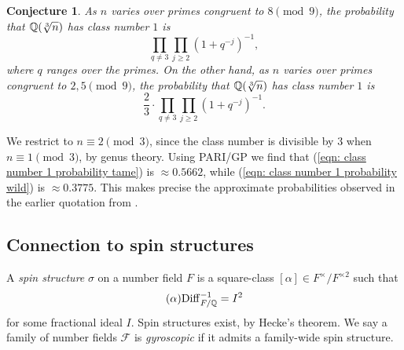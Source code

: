 \documentclass[11pt,a4paper]{amsart}
\def\Q{{\rm \mathbb{Q}}}
\def\Diff{{\rm Diff}}
\numberwithin{equation}{section}
\newtheorem{conjecture}[theorem]{Conjecture}
\begin{document}
\begin{conjecture} \label{conj: probability that h/h3 = 1}
As $n$ varies over primes congruent to $8 \pmod{9}$, the probability that 
$\Q(\sqrt[3]{n})$ has class number $1$ is
\begin{equation} \label{eqn: class number 1 probability tame}
    \prod_{q \neq 3} \prod_{j \ge 2} (1+q^{-j})^{-1},
\end{equation}
where $q$ ranges over the primes. On the other hand, as $n$ varies over primes congruent to $2,5 \pmod{9}$,  the probability that $\Q(\sqrt[3]{n})$ has class number $1$ is
\begin{equation} \label{eqn: class number 1 probability wild}
    \frac23\cdot 
\prod_{q\neq3} \prod_{j \ge 2} (1+q^{-j})^{-1}.
\end{equation}
\end{conjecture}
We restrict to $n \equiv 2\pmod{3}$, since the class number is divisible by $3$ when $n \equiv 1\pmod{3}$, by genus theory. Using PARI/GP \cite{PariGp} we find that (\ref{eqn: class number 1 probability tame}) is $\approx 0.5662$, while (\ref{eqn: class number 1 probability wild}) is $\approx 0.3775$. This makes precise the approximate probabilities observed in the earlier quotation from \cite{CohenMartinet87}. 


\subsection{Connection to spin structures} \label{sec: connection to spin structures}

A {\it spin structure} $\sigma$ on a number field $F$ is a square-class $[\alpha] \in F^\times/F^{\times 2}$ such that $$(\alpha)\Diff_{F/\Q}^{-1} = I^2 $$ for some fractional ideal $I$. Spin structures exist, by Hecke's theorem. 
We say a family of number fields $\mathcal{F}$ is {\it gyroscopic} if it admits a family-wide spin structure. 
\end{document}
